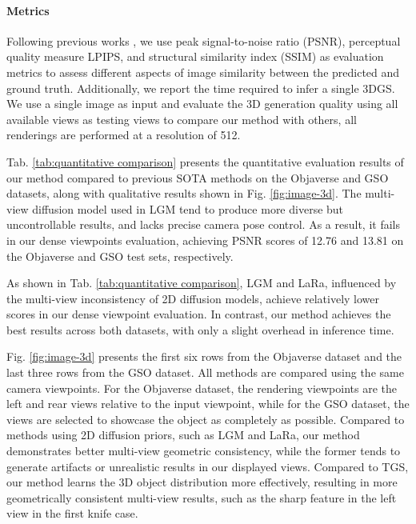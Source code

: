 \paragraph{Metrics} 
Following previous works \cite{zou2024triplane, chen2025lara}, we use peak signal-to-noise ratio (PSNR), perceptual quality measure LPIPS, and structural similarity index (SSIM) as evaluation metrics to assess different aspects of image similarity between the predicted and ground truth. Additionally, we report the time required to infer a single 3DGS. We use a single image as input and evaluate the 3D generation quality using all available views as testing views to compare our method with others, all renderings are performed at a resolution of 512.

Tab. \ref{tab:quantitative comparison} presents the quantitative evaluation results of our method compared to previous SOTA methods on the Objaverse and GSO datasets, along with qualitative results shown in Fig. \ref{fig:image-3d}. The multi-view diffusion model used in LGM tend to produce more diverse but uncontrollable results, and lacks precise camera pose control. As a result, it fails in our dense viewpoints evaluation, achieving PSNR scores of 12.76 and 13.81 on the Objaverse and GSO test sets, respectively.

As shown in Tab. \ref{tab:quantitative comparison}, LGM and LaRa, influenced by the multi-view inconsistency of 2D diffusion models, achieve relatively lower scores in our dense viewpoint evaluation. In contrast, our method achieves the best results across both datasets, with only a slight overhead in inference time.

Fig. \ref{fig:image-3d} presents the first six rows from the Objaverse dataset and the last three rows from the GSO dataset. All methods are compared using the same camera viewpoints. For the Objaverse dataset, the rendering viewpoints are the left and rear views relative to the input viewpoint, while for the GSO dataset, the views are selected to showcase the object as completely as possible. Compared to methods using 2D diffusion priors, such as LGM and LaRa, our method demonstrates better multi-view geometric consistency, while the former tends to generate artifacts or unrealistic results in our displayed views. Compared to TGS, our method learns the 3D object distribution more effectively, resulting in more geometrically consistent multi-view results, such as the sharp feature in the left view in the first knife case.

